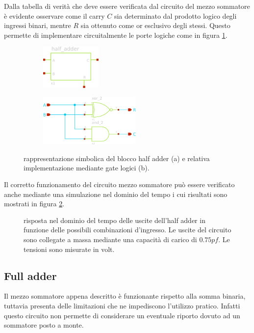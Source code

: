 	Dalla tabella di verità che deve essere verificata dal circuito del mezzo sommatore è evidente osservare come il carry $C$ sia determinato dal prodotto logico degli ingressi binari, mentre $R$ sia ottenuto come or esclusivo degli stessi. Questo permette di implementare circuitalmente le porte logiche come in figura \ref{fig:ha:sch}.
	
	\begin{figure}[H]
		\centering
		\begin{subfigure}{0.48\linewidth}
			\centering
			\includegraphics[width=3cm]{Immagini/half-adder}
			\caption{}
		\end{subfigure}
		\begin{subfigure}{0.48\linewidth}
			\centering
			\includegraphics[width=5cm]{Immagini/half-adder-sch}
			\caption{}
		\end{subfigure}
		\caption{rappresentazione simbolica del blocco half adder (a) e relativa implementazione mediante gate logici (b).}
		\label{fig:ha:sch}
	\end{figure}
	
	Il corretto funzionamento del circuito mezzo sommatore può essere verificato anche mediante una simulazione nel dominio del tempo i cui risultati sono mostrati in figura \ref{fig:ha:sim}.	
	\begin{figure}[bht]
		\centering
		
		\caption{risposta nel dominio del tempo delle uscite dell'half adder in funzione delle possibili combinazioni d'ingresso. Le uscite del circuito sono collegate a massa mediante una capacità di carico di $0.75pf$. Le tensioni sono misurate in volt.}
		\label{fig:ha:sim}
	\end{figure}

\subsection*{Full adder}
	Il mezzo sommatore appena descritto è funzionante rispetto alla somma binaria, tuttavia presenta delle limitazioni che ne impediscono l'utilizzo pratico. Infatti questo circuito non permette di considerare un eventuale riporto dovuto ad un sommatore posto a monte.
	
